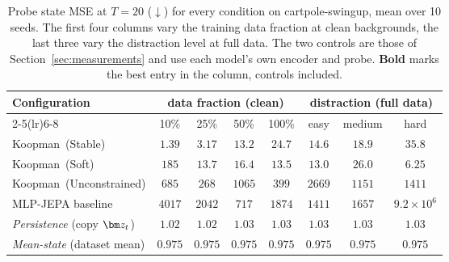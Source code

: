 \begin{table}[t]
\caption{Probe state MSE at $T{=}20$ ($\downarrow$) for every condition on cartpole-swingup, mean over 10 seeds. The first four columns vary the training data fraction at clean backgrounds, the last three vary the distraction level at full data. The two controls are those of Section~\ref{sec:measurements} and use each model's own encoder and probe. \textbf{Bold} marks the best entry in the column, controls included.}
\label{tab:full_controls_cartpole}
\centering
\small
\begin{tabular}{@{}lccccccc@{}}
\toprule
\textbf{Configuration} & \multicolumn{4}{c}{\textbf{data fraction (clean)}} & \multicolumn{3}{c}{\textbf{distraction (full data)}} \\
\cmidrule(lr){2-5}\cmidrule(lr){6-8}
 & 10\% & 25\% & 50\% & 100\% & easy & medium & hard \\
\midrule
Koopman~(Stable)                   & $1.39$ & $3.17$ & $13.2$ & $24.7$ & $14.6$ & $18.9$ & $35.8$ \\
Koopman~(Soft)                     & $185$ & $13.7$ & $16.4$ & $13.5$ & $13.0$ & $26.0$ & $6.25$ \\
Koopman~(Unconstrained)            & $685$ & $268$ & $1065$ & $399$ & $2669$ & $1151$ & $1411$ \\
MLP-JEPA baseline                  & $4017$ & $2042$ & $717$ & $1874$ & $1411$ & $1657$ & $9.2{\times}10^{6}$ \\
\midrule
\emph{Persistence} (copy $\z_t$)   & $1.02$ & $1.02$ & $1.03$ & $1.03$ & $1.03$ & $1.03$ & $1.03$ \\
\emph{Mean-state} (dataset mean)   & $\mathbf{0.975}$ & $\mathbf{0.975}$ & $\mathbf{0.975}$ & $\mathbf{0.975}$ & $\mathbf{0.975}$ & $\mathbf{0.975}$ & $\mathbf{0.975}$ \\
\bottomrule
\end{tabular}
\end{table}
